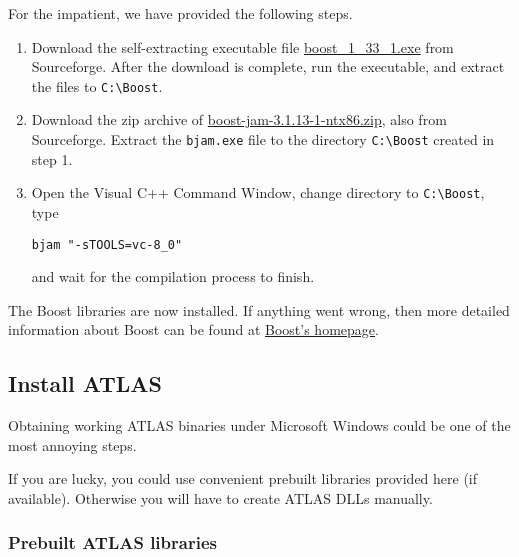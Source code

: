 \documentclass{article}
\begin{document}
For the impatient, we have provided the following steps.
%
\begin{enumerate}
\item Download the self-extracting executable file
\href{http://prdownloads.sourceforge.net/boost/boost_1_33_1.exe?download}
{boost_1_33_1.exe} from Sourceforge. 
After the download is complete, run the
executable, and extract the files to \texttt{C:\textbackslash Boost}.

\item Download the zip archive of 
\href{http://prdownloads.sourceforge.net/boost/boost-jam-3.1.13-1-ntx86.zip?download}
{boost-jam-3.1.13-1-ntx86.zip}, also from Sourceforge. 
Extract the \texttt{bjam.exe} file to the directory \texttt{C:\textbackslash Boost} created in step 1.

\item Open the Visual C++ Command Window, change directory to \texttt{C:\textbackslash Boost}, 
type
\begin{verbatim}
bjam "-sTOOLS=vc-8_0"
\end{verbatim}
and wait for the compilation process to finish.

\end{enumerate}
%
The Boost libraries are now installed. If anything went wrong, then more detailed information about 
Boost can be found at  \href{http://www.boost.org/}{Boost's homepage}.

% 


\subsection{Install ATLAS}

Obtaining working ATLAS binaries under Microsoft Windows could be one of the
most annoying steps. 

If you are lucky, you could use 
convenient prebuilt libraries provided here (if available). Otherwise 
you will have to create ATLAS DLLs
manually. 

\subsubsection{Prebuilt ATLAS libraries}
\end{document}
